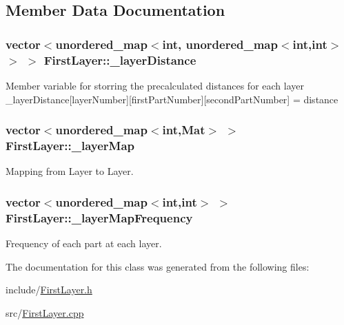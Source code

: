 \subsection{Member Data Documentation}
\hypertarget{class_first_layer_abd09e90b6c65da988079abe99f3b5e34}{
\subsubsection[{\-\_\-layer\-Distance}]{\setlength{\rightskip}{0pt plus 5cm}vector$<$unordered\-\_\-map$<$int, unordered\-\_\-map$<$int,int$>$ $>$ $>$ First\-Layer\-::\-\_\-layer\-Distance}}\label{class_first_layer_abd09e90b6c65da988079abe99f3b5e34}
Member variable for storring the precalculated distances for each layer \-\_\-layer\-Distance\mbox{[}layer\-Number\mbox{]}\mbox{[}first\-Part\-Number\mbox{]}\mbox{[}second\-Part\-Number\mbox{]} = distance \hypertarget{class_first_layer_a7818bd290e7b21a32b3d150941ab55df}{
\subsubsection[{\-\_\-layer\-Map}]{\setlength{\rightskip}{0pt plus 5cm}vector$<$unordered\-\_\-map$<$int,Mat$>$ $>$ First\-Layer\-::\-\_\-layer\-Map}}\label{class_first_layer_a7818bd290e7b21a32b3d150941ab55df}


Mapping from Layer to Layer. 

\hypertarget{class_first_layer_a63f941b882ec8f2c8d92b454ec4114c0}{
\subsubsection[{\-\_\-layer\-Map\-Frequency}]{\setlength{\rightskip}{0pt plus 5cm}vector$<$unordered\-\_\-map$<$int,int$>$ $>$ First\-Layer\-::\-\_\-layer\-Map\-Frequency}}\label{class_first_layer_a63f941b882ec8f2c8d92b454ec4114c0}


Frequency of each part at each layer. 



The documentation for this class was generated from the following files\-:\begin{DoxyCompactItemize}
\item 
include/\hyperlink{_first_layer_8h}{First\-Layer.\-h}\item 
src/\hyperlink{_first_layer_8cpp}{First\-Layer.\-cpp}\end{DoxyCompactItemize}

